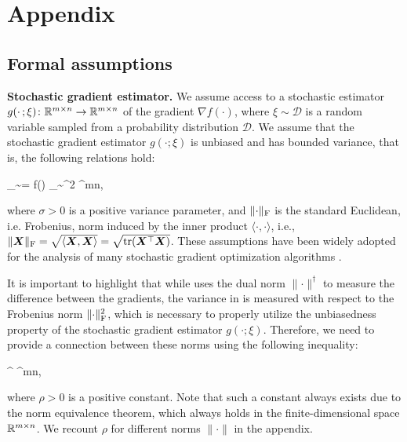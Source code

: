 \documentclass{article} %
\newcommand{\norm}[1]{\lVert #1\rVert}
\newcommand{\Rmn}{\R^{m\times n}}
\newcommand{\cD}{\mathcal{D}}
\newcommand{\Ed}[2]{\mathbb{E}_{#1}\left[#2\right]}
\DeclarePairedDelimiter{\normf}{\|}{\|_\mathrm{F}}
\DeclarePairedDelimiter{\sqnf}{\|}{\|_{\mathrm{F}}^2}
\def\<#1,#2>{\langle #1,#2\rangle}
\newcounter{aequation}
\DeclareMathOperator{\tr}{tr}
\begin{document}




\section{Appendix}
\subsection{Formal assumptions}
{\bf Stochastic gradient estimator.}
    We assume access to a stochastic estimator $g(\cdot\,;\xi)\colon \Rmn \to \Rmn$ of the gradient $\nabla f(\cdot)$, where $\xi \sim \cD$ is a random variable sampled from a probability distribution $\cD$. We assume that the stochastic gradient estimator $g(\cdot;\xi)$ is unbiased and has bounded variance, that is, the following relations hold:
    \begin{aequation}\label{eq:variance}
    \Ed{\xi \sim \cD}{g(\mX;\xi)} = \nabla f(\mX)
    \quad{}\quad
    \Ed{\xi \sim \cD}{\sqnf{g(\mX;\xi) - \nabla f(\mX)}} \leq \sigma^2
    \quad{}\;
    \mX \in \Rmn,
    \end{aequation}
    where $\sigma > 0$ is a positive variance parameter, and $\normf{\cdot}$ is the standard Euclidean, i.e. Frobenius, norm induced by the inner product $\<\cdot,\cdot>$, i.e., $\normf{\mX} = \sqrt{\<\mX,\mX>}=\sqrt{\tr(\mX^\top \mX)}$. These assumptions have been widely adopted for the analysis of many stochastic gradient optimization algorithms \citep{ghadimi2013stochastic,ghadimi2016accelerated,cutkosky2020momentum,sun2023momentum,horvath2023stochastic,gorbunov2020linearly}.

    It is important to highlight that while  uses the dual norm $\norm{\cdot}^\dagger$ to measure the difference between the gradients, the variance in  is measured with respect to the Frobenius norm $\sqnf{\cdot}$, which is necessary to properly utilize the unbiasedness property of the stochastic gradient estimator $g(\cdot;\xi)$. Therefore, we need to provide a connection between these norms using the following inequality:
    \begin{aequation}\label{eq:norm}
    \norm{\mX}^\dagger \leq \rho\cdot\normf{\mX}
    \quad{}\;
    \mX \in \Rmn,
    \end{aequation}
    where $\rho > 0$ is a positive constant. Note that such a constant always exists due to the norm equivalence theorem, which always holds in the finite-dimensional space $\Rmn$. We recount $\rho$ for different norms $\norm{\cdot}$ in the appendix.
\end{document}
